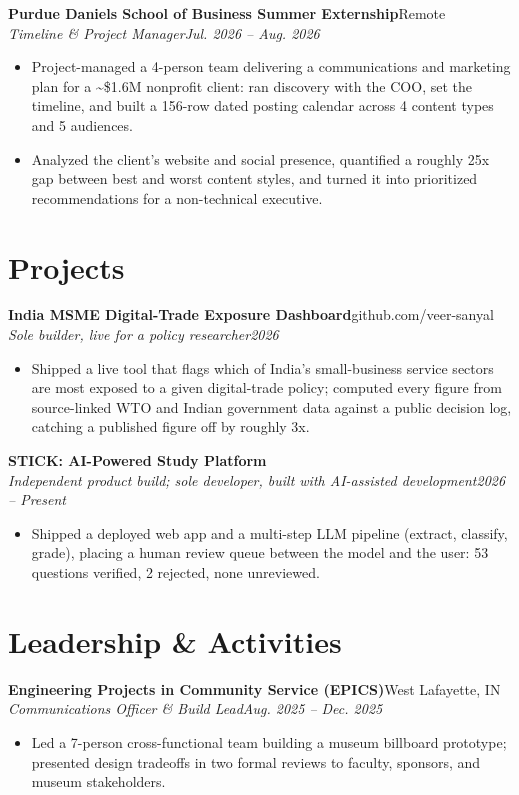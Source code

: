 \documentclass[10pt,letterpaper]{article}
\newcommand{\entry}[4]{%
  \textbf{#1}\hfill #2\\[1pt]
  \textit{#3}\hfill \textit{#4}\\[2pt]
}
\begin{document}
\entry{Purdue Daniels School of Business Summer Externship}{Remote}{Timeline \& Project Manager}{Jul. 2026 -- Aug. 2026}
\begin{itemize}
  \item Project-managed a 4-person team delivering a communications and marketing plan for a \textasciitilde\$1.6M nonprofit client: ran discovery with the COO, set the timeline, and built a 156-row dated posting calendar across 4 content types and 5 audiences.
  \item Analyzed the client's website and social presence, quantified a roughly 25x gap between best and worst content styles, and turned it into prioritized recommendations for a non-technical executive.
\end{itemize}

\section*{Projects}
\entry{India MSME Digital-Trade Exposure Dashboard}{github.com/veer-sanyal}{Sole builder, live for a policy researcher}{2026}
\begin{itemize}
  \item Shipped a live tool that flags which of India's small-business service sectors are most exposed to a given digital-trade policy; computed every figure from source-linked WTO and Indian government data against a public decision log, catching a published figure off by roughly 3x.
\end{itemize}

\entry{STICK: AI-Powered Study Platform}{}{Independent product build; sole developer, built with AI-assisted development}{2026 -- Present}
\begin{itemize}
  \item Shipped a deployed web app and a multi-step LLM pipeline (extract, classify, grade), placing a human review queue between the model and the user: 53 questions verified, 2 rejected, none unreviewed.
\end{itemize}

\section*{Leadership \& Activities}
\entry{Engineering Projects in Community Service (EPICS)}{West Lafayette, IN}{Communications Officer \& Build Lead}{Aug. 2025 -- Dec. 2025}
\begin{itemize}
  \item Led a 7-person cross-functional team building a museum billboard prototype; presented design tradeoffs in two formal reviews to faculty, sponsors, and museum stakeholders.
\end{itemize}
\end{document}
